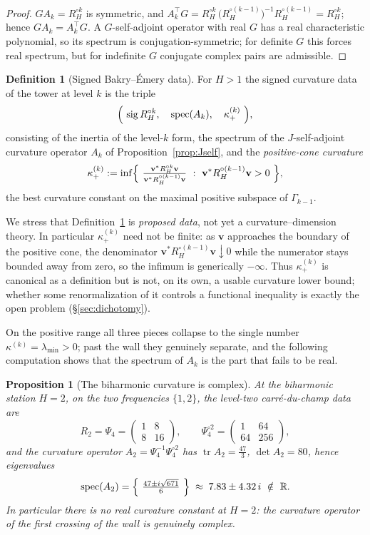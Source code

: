 \documentclass[11pt,reqno]{amsart}
\theoremstyle{plain}
\newtheorem{proposition}[theorem]{Proposition}
\theoremstyle{definition}
\newtheorem{definition}[theorem]{Definition}
\newcommand{\R}{\mathbb{R}}
\newcommand{\Had}{\mathbin{\circ}}
\newcommand{\Gam}{\Gamma}
\DeclareMathOperator{\spec}{spec}
\DeclareMathOperator{\tr}{tr}
\DeclareMathOperator{\sig}{sig}
\begin{document}
\begin{proof}
$GA_k=R_H^{\Had k}$ is symmetric, and $A_k^{\top}G=R_H^{\Had k}\,
\bigl(R_H^{\Had(k-1)}\bigr)^{-1}R_H^{\Had(k-1)}=R_H^{\Had k}$; hence
$GA_k=A_k^{\top}G$. A $G$-self-adjoint operator with real $G$ has a real
characteristic polynomial, so its spectrum is conjugation-symmetric; for definite
$G$ this forces real spectrum, but for indefinite $G$ conjugate complex pairs are
admissible.
\end{proof}

\begin{definition}[Signed Bakry--\'Emery data]\label{def:signed}
For $H>1$ the signed curvature data of the tower at level $k$ is the triple
\[
  \Bigl(\ \sig R_H^{\Had k},\quad \spec(A_k),\quad \kappa_+^{(k)}\ \Bigr),
\]
consisting of the inertia of the level-$k$ form, the spectrum of the
$J$-self-adjoint curvature operator $A_k$ of Proposition~\ref{prop:Jself}, and the
\emph{positive-cone curvature}
\[
  \kappa_+^{(k)}:=\inf\Bigl\{\ \tfrac{\mathbf v^{*}R_H^{\Had k}\mathbf v}
  {\mathbf v^{*}R_H^{\Had(k-1)}\mathbf v}\ :\
  \mathbf v^{*}R_H^{\Had(k-1)}\mathbf v>0\ \Bigr\},
\]
the best curvature constant on the maximal positive subspace of $\Gam_{k-1}$.
\end{definition}

We stress that Definition~\ref{def:signed} is \emph{proposed data}, not yet a
curvature--dimension theory. In particular $\kappa_+^{(k)}$ need not be finite:
as $\mathbf v$ approaches the boundary of the positive cone, the denominator
$\mathbf v^{*}R_H^{\Had(k-1)}\mathbf v\downarrow0$ while the numerator stays
bounded away from zero, so the infimum is generically $-\infty$. Thus
$\kappa_+^{(k)}$ is canonical as a definition but is not, on its own, a usable
curvature lower bound; whether some renormalization of it controls a functional
inequality is exactly the open problem (\S\ref{sec:dichotomy}).

On the positive range all three pieces collapse to the single number
$\kappa^{(k)}=\lambda_{\min}>0$; past the wall they genuinely separate, and the
following computation shows that the spectrum of $A_k$ is the part that fails to
be real.

\begin{proposition}[The biharmonic curvature is complex]\label{prop:complex}
At the biharmonic station $H=2$, on the two frequencies $\{1,2\}$, the level-two
carr\'e-du-champ data are
\[
  R_2=\Psi_4=\begin{pmatrix}1&8\\8&16\end{pmatrix},\qquad
  \Psi_4^{\Had2}=\begin{pmatrix}1&64\\64&256\end{pmatrix},
\]
and the curvature operator $A_2=\Psi_4^{-1}\Psi_4^{\Had2}$ has
$\tr A_2=\tfrac{47}{3}$, $\det A_2=80$, hence eigenvalues
\[
  \spec(A_2)=\Bigl\{\ \tfrac{47\pm i\sqrt{671}}{6}\ \Bigr\}
  \;\approx\;7.83\pm 4.32\,i\ \notin\ \R .
\]
In particular there is no real curvature constant at $H=2$: the curvature operator
of the first crossing of the wall is genuinely complex.
\end{proposition}
\end{document}
